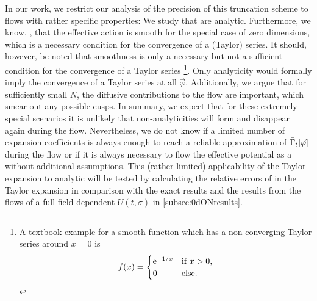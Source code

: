 In our work, we restrict our analysis of the precision of this truncation scheme to \frg{} flows with rather specific properties: We study \ics{} that are analytic.
Furthermore, we know, \cf{} \MWApp{}, that the \ir{} effective action is smooth for the special case of zero dimensions, which is a necessary condition for the convergence of a (Taylor) series.
It should, however, be noted that smoothness is only a necessary but not a sufficient condition for the convergence of a Taylor series%
\footnote{%
	A textbook example for a smooth function which has a non-converging Taylor series around $x = 0$ is $$f ( x ) = \begin{cases} \mathrm{e}^{-1/x} & \text{if } x>0, \\ 0 &\text{else.}\end{cases}$$
}.
Only analyticity would formally imply the convergence of a Taylor series at all $\vec{\varphi}$.
Additionally, we argue that for sufficiently small $N$, the diffusive contributions to the \frg{} flow are important, which smear out any possible cusps.
In summary, we expect that for these extremely special scenarios it is unlikely that non-analyticities will form and disappear again during the \frg{} flow.
Nevertheless, we do not know if a limited number of expansion coefficients is always enough to reach a reliable approximation of $\bar{\Gamma}_t [ \vec{\varphi} \mskip1.0mu ]$ during the \frg{} flow or if it is always necessary to flow the effective potential as a \pde{} without additional assumptions.
This (rather limited) applicability of the \frg{} Taylor expansion to analytic \ics{} will be tested by calculating the relative errors of \ipi{} \nptFunctions{} in the \frg{} Taylor expansion in comparison with the exact results and the results from the flows of a full field-dependent $U ( t, \sigma )$ in \cref{subsec:0dONresults}.\bigskip

